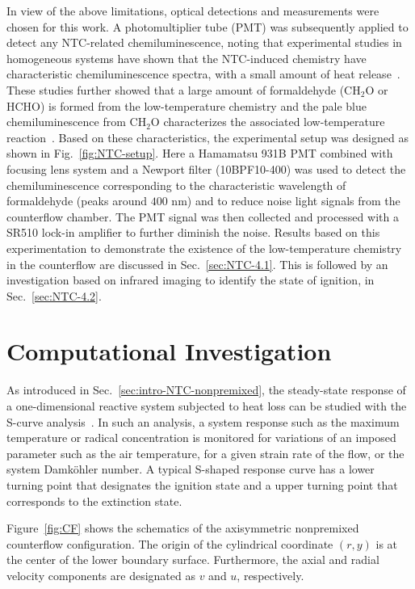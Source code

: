 In view of the above limitations, optical detections and measurements were chosen for this work.  A photomultiplier tube (PMT) was subsequently applied to detect any NTC-related chemiluminescence, noting that experimental studies in homogeneous systems have shown that the NTC-induced chemistry have characteristic chemiluminescence spectra, with a small amount of heat release~\cite{sheinson73,ohta91}.  These studies further showed that a large amount of formaldehyde (CH$_2$O or HCHO) is formed from the low-temperature chemistry and the pale blue chemiluminescence from CH$_2$O characterizes the associated low-temperature reaction~\cite{gaydonbook}.  Based on these characteristics, the experimental setup was designed as shown in Fig.~\ref{fig:NTC-setup}. Here a Hamamatsu 931B PMT combined with focusing lens system and a Newport filter (10BPF10-400) was used to detect the chemiluminescence corresponding to the characteristic wavelength of formaldehyde (peaks around $400$ nm) and to reduce noise light signals from the counterflow chamber. The PMT signal was then collected and processed with a SR510 lock-in amplifier to further diminish the noise.  Results based on this experimentation to demonstrate the existence of the low-temperature chemistry in the counterflow are discussed in Sec.~\ref{sec:NTC-4.1}.  This is followed by an investigation based on infrared imaging to identify the state of ignition, in Sec.~\ref{sec:NTC-4.2}. 

\section{Computational Investigation}\label{sec:NTC-comp}

As introduced in Sec.~\ref{sec:intro-NTC-nonpremixed}, the steady-state response of a one-dimensional reactive system subjected to heat loss can be studied with the S-curve analysis~\cite{lawbook}. In such an analysis, a system response such as the maximum temperature or radical concentration is monitored for variations of an imposed parameter such as the air temperature, for a given strain rate of the flow, or the system Damk\"ohler number.  A typical S-shaped response curve has a lower turning point that designates the ignition state and a upper turning point that corresponds to the extinction state.  

Figure~\ref{fig:CF} shows the schematics of the axisymmetric nonpremixed counterflow configuration.  The origin of the cylindrical coordinate $(r,y)$ is at the center of the lower boundary surface.  Furthermore, the axial and radial velocity components are designated as $v$ and $u$, respectively.  


